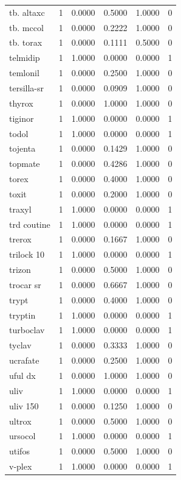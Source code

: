 \begin{longtable}{p{3.0cm}rrrrr}
tb. altaxc & 1 & 0.0000 & 0.5000 & 1.0000 & 0 \\
tb. mccol & 1 & 0.0000 & 0.2222 & 1.0000 & 0 \\
tb. torax & 1 & 0.0000 & 0.1111 & 0.5000 & 0 \\
telmidip & 1 & 1.0000 & 0.0000 & 0.0000 & 1 \\
temlonil & 1 & 0.0000 & 0.2500 & 1.0000 & 0 \\
tersilla-sr & 1 & 0.0000 & 0.0909 & 1.0000 & 0 \\
thyrox & 1 & 0.0000 & 1.0000 & 1.0000 & 0 \\
tiginor & 1 & 1.0000 & 0.0000 & 0.0000 & 1 \\
todol & 1 & 1.0000 & 0.0000 & 0.0000 & 1 \\
tojenta & 1 & 0.0000 & 0.1429 & 1.0000 & 0 \\
topmate & 1 & 0.0000 & 0.4286 & 1.0000 & 0 \\
torex & 1 & 0.0000 & 0.4000 & 1.0000 & 0 \\
toxit & 1 & 0.0000 & 0.2000 & 1.0000 & 0 \\
traxyl & 1 & 1.0000 & 0.0000 & 0.0000 & 1 \\
trd coutine & 1 & 1.0000 & 0.0000 & 0.0000 & 1 \\
trerox & 1 & 0.0000 & 0.1667 & 1.0000 & 0 \\
trilock 10 & 1 & 1.0000 & 0.0000 & 0.0000 & 1 \\
trizon & 1 & 0.0000 & 0.5000 & 1.0000 & 0 \\
trocar sr & 1 & 0.0000 & 0.6667 & 1.0000 & 0 \\
trypt & 1 & 0.0000 & 0.4000 & 1.0000 & 0 \\
tryptin & 1 & 1.0000 & 0.0000 & 0.0000 & 1 \\
turboclav & 1 & 1.0000 & 0.0000 & 0.0000 & 1 \\
tyclav & 1 & 0.0000 & 0.3333 & 1.0000 & 0 \\
ucrafate & 1 & 0.0000 & 0.2500 & 1.0000 & 0 \\
uful dx & 1 & 0.0000 & 1.0000 & 1.0000 & 0 \\
uliv & 1 & 1.0000 & 0.0000 & 0.0000 & 1 \\
uliv 150 & 1 & 0.0000 & 0.1250 & 1.0000 & 0 \\
ultrox & 1 & 0.0000 & 0.5000 & 1.0000 & 0 \\
ursocol & 1 & 1.0000 & 0.0000 & 0.0000 & 1 \\
utifos & 1 & 0.0000 & 0.5000 & 1.0000 & 0 \\
v-plex & 1 & 1.0000 & 0.0000 & 0.0000 & 1 \\

\end{longtable}
